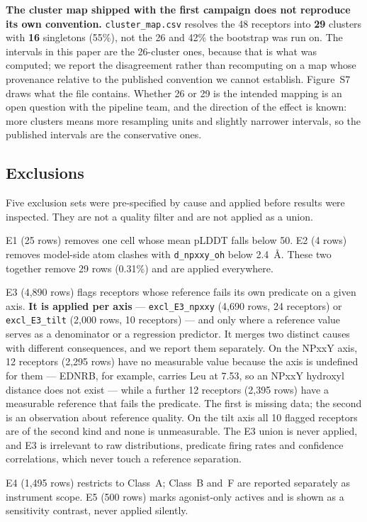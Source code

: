 \textbf{The cluster map shipped with the first campaign does not reproduce its
own convention.} \texttt{cluster\_map.csv} resolves the 48 receptors into
\textbf{29} clusters with \textbf{16} singletons (55\%), not the 26 and 42\%
the bootstrap was run on. The intervals in this paper are the 26-cluster ones,
because that is what was computed; we report the disagreement rather than
recomputing on a map whose provenance relative to the published convention we
cannot establish. Figure~S7 draws what the file contains. Whether 26 or 29 is
the intended mapping is an open question with the pipeline team, and the
direction of the effect is known: more clusters means more resampling units and
slightly narrower intervals, so the published intervals are the conservative
ones.

\subsection*{Exclusions}

Five exclusion sets were pre-specified by cause and applied before results were
inspected. They are not a quality filter and are not applied as a union.

E1 (25 rows) removes one cell whose mean pLDDT falls below 50. E2 (4 rows)
removes model-side atom clashes with \texttt{d\_npxxy\_oh} below 2.4~\AA. These
two together remove 29 rows (0.31\%) and are applied everywhere.

E3 (4{,}890 rows) flags receptors whose reference fails its own predicate on a
given axis. \textbf{It is applied per axis} --- \texttt{excl\_E3\_npxxy}
(4{,}690 rows, 24 receptors) or \texttt{excl\_E3\_tilt} (2{,}000 rows, 10
receptors) --- and only where a reference value serves as a denominator or a
regression predictor. It merges two distinct causes with different
consequences, and we report them separately. On the NPxxY axis, 12 receptors
(2{,}295 rows) have no measurable value because the axis is undefined for them
--- EDNRB, for example, carries Leu at 7.53, so an NPxxY hydroxyl distance does
not exist --- while a further 12 receptors (2{,}395 rows) have a measurable
reference that fails the predicate. The first is missing data; the second is an
observation about reference quality. On the tilt axis all 10 flagged receptors
are of the second kind and none is unmeasurable. The E3 union is never applied, and E3 is irrelevant to raw
distributions, predicate firing rates and confidence correlations, which never
touch a reference separation.

E4 (1{,}495 rows) restricts to Class~A; Class~B and~F are reported separately as
instrument scope. E5 (500 rows) marks agonist-only actives and is shown as a
sensitivity contrast, never applied silently.

